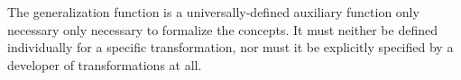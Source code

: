 
The generalization function is a universally-defined auxiliary function only necessary only necessary to formalize the concepts.
It must neither be defined individually for a specific transformation, nor must it be explicitly specified by a developer of transformations at all.

